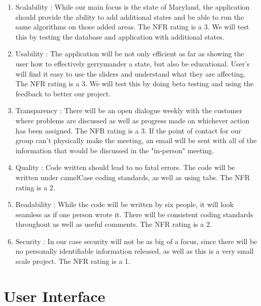 \documentclass{article}
\begin{document}
\begin{addmargin}[2em]{0em}
\begin{enumerate}
\item Scalability : While our main focus is the state of Maryland, the application should provide the ability to add additional states and be able to run the same algorithms on those added areas. The NFR rating is a 3. We will test this by testing the database and application with additional states.

\item Usability : The application will be not only efficient as far as showing the user how to effectively gerrymander a state, but also be educational. User's will find it easy to use the sliders and understand what they are affecting. The NFR rating is a 3. We will test this by doing beta testing and using the feedback to better our project. 

\item Transparency : There will be an open dialogue weekly with the customer where problems are discussed as well as progress made on whichever action has been assigned. The NFR rating is a 3. If the point of contact for our group can't physically make the meeting, an email will be sent with all of the information that would be discussed in the "in-person" meeting.

\item Quality : Code written should lead to no fatal errors. The code will be written under camelCase coding standards, as well as using tabs. The NFR rating is a 2.

\item Readability : While the code will be written by six people, it will look seamless as if one person wrote it. There will be consistent coding standards throughout as well as useful comments. The NFR rating is a 2.

\item Security : In our case security will not be as big of a focus, since there will be no personally identifiable information released, as well as this is a very small scale project. The NFR rating is a 1.

\end{enumerate}
\end{addmargin}


\section{User Interface}\label{sec:ui}
\vspace{2.5mm}
\end{document}

